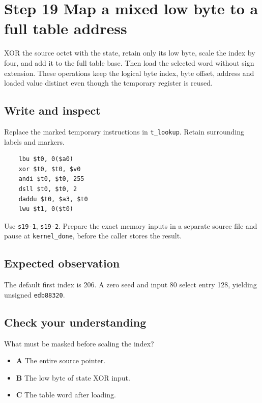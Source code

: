 \section{Step 19 Map a mixed low byte to a full table address}\label{crc-s19}

XOR the source octet with the state, retain only its low byte, scale the index by four, and add it to the full table base. Then load the selected word without sign extension. These operations keep the logical byte index, byte offset, address and loaded value distinct even though the temporary register is reused.

\subsection{Write and inspect}
Replace the marked temporary instructions in \texttt{t\_lookup}. Retain surrounding labels and markers.

\begin{verbatim}
    lbu $t0, 0($a0)
    xor $t0, $t0, $v0
    andi $t0, $t0, 255
    dsll $t0, $t0, 2
    daddu $t0, $a3, $t0
    lwu $t1, 0($t0)
\end{verbatim}

Use \texttt{s19-1}, \texttt{s19-2}. Prepare the exact memory inputs in a separate source file and pause at \texttt{kernel\_done}, before the caller stores the result.

\subsection{Expected observation}
The default first index is 206. A zero seed and input 80 select entry 128, yielding unsigned \texttt{edb88320}.

\subsection{Check your understanding}
What must be masked before scaling the index?

\begin{itemize}
  \item \textbf{A} The entire source pointer.
  \item \textbf{B} The low byte of state XOR input.
  \item \textbf{C} The table word after loading.
\end{itemize}
